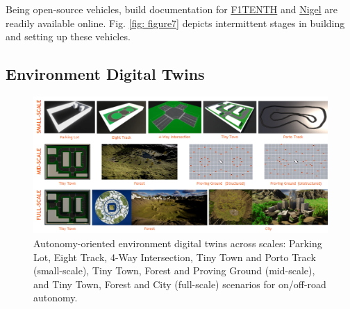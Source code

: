 Being open-source vehicles, build documentation for \href{https://f1tenth.org/build.html}{F1TENTH} and \href{https://github.com/Tinker-Twins/AutoDRIVE/blob/AutoDRIVE-Testbed/Documents/Nigel - Assembly Guide.pdf}{Nigel} are readily available online. Fig. \ref{fig: figure7} depicts intermittent stages in building and setting up these vehicles.

\hypertarget{Environment Digital Twins}{%
\subsection{Environment Digital Twins}\label{Environment Digital Twins}}

\begin{figure}[h]
    \centering
    \includegraphics[width=\linewidth]{Figures/fig8.png}
    \caption{Autonomy-oriented environment digital twins across scales: Parking Lot, Eight Track, 4-Way Intersection, Tiny Town and Porto Track (small-scale), Tiny Town, Forest and Proving Ground (mid-scale), and Tiny Town, Forest and City (full-scale) scenarios for on/off-road autonomy.}
    \label{fig: figure8}
\end{figure}

